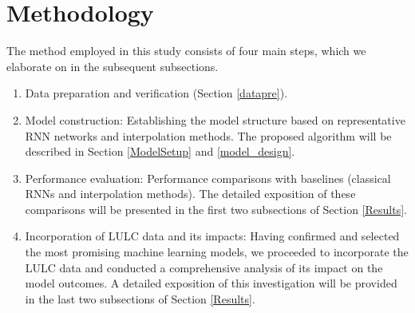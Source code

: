 \documentclass[a4paper,fleqn]{cas-sc}
\begin{document}


\section{Methodology}\label{Methodology}

The method employed in this study consists of four main steps, which we elaborate on in the subsequent subsections. 
\begin{enumerate}
    \item Data preparation and verification (Section \ref{datapre}).
    \item Model construction: Establishing the model structure based on representative RNN networks and interpolation methods. The proposed algorithm will be described in Section \ref{ModelSetup} and \ref{model_design}.
    \item Performance evaluation: Performance comparisons with baselines (classical RNNs and interpolation methods). The detailed exposition of these comparisons will be presented in the first two subsections of Section \ref{Results}.
    \item Incorporation of LULC data and its impacts: Having confirmed and selected the most promising machine learning models, we proceeded to incorporate the LULC data and conducted a comprehensive analysis of its impact on the model outcomes. A detailed exposition of this investigation will be provided in the last two subsections of Section \ref{Results}.
\end{enumerate}
\end{document}
